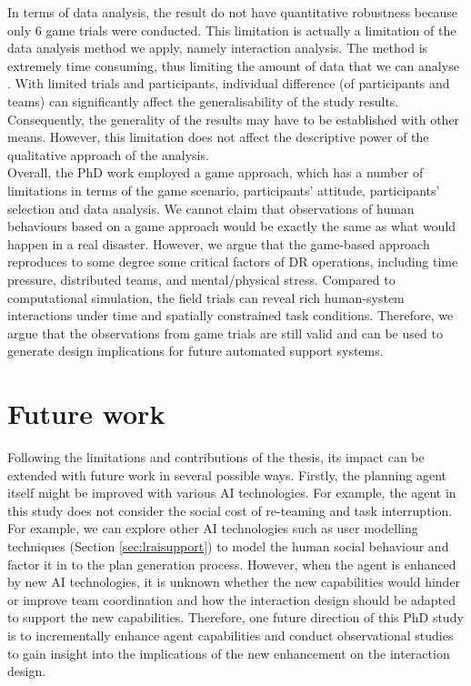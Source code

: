 In terms of data analysis, the result do not have quantitative robustness because only 6 game trials were conducted. This limitation is actually a limitation of the data analysis method we apply, namely interaction analysis. The method is extremely time consuming, thus limiting the amount of data that we can analyse \citep{Crabtree2012}. With limited trials and participants, individual difference (of participants and teams) can significantly affect the generalisability of the study results. Consequently, the generality of the results may have to be established with other means. However, this limitation does not affect the descriptive power of the qualitative approach of the analysis. \\

Overall, the PhD work employed a game approach, which has a number of limitations in terms of the game scenario, participants' attitude, participants' selection and data analysis. We cannot claim that observations of human behaviours based on a game approach would be exactly the same as what would happen in a real disaster. However, we argue that the game-based approach reproduces to some degree some critical factors of \ac{DR} operations, including time pressure, distributed teams, and mental/physical stress. Compared to computational simulation, the field trials can reveal rich human-system interactions under time and spatially constrained task conditions. Therefore, we argue that the observations from game trials are still valid and can be used to generate design implications for future automated support systems. \\


\section{Future work}
Following the limitations and contributions of the thesis, its impact can be extended with future work in several possible ways. Firstly, the planning agent itself might be improved with various AI technologies. For example, the agent in this study does not consider the social cost of re-teaming and task interruption. For example, we can explore other AI technologies such as user modelling techniques (Section \ref{sec:lraisupport}) to model the human social behaviour and factor it in to the plan generation process.  However, when the agent is enhanced by new AI technologies, it is unknown whether the new capabilities would hinder or improve team coordination and how the interaction design should be adapted to support the new capabilities. Therefore, one future direction of this PhD study is to incrementally enhance agent capabilities and conduct observational studies to gain insight into the implications of the new enhancement on the interaction design.\\

